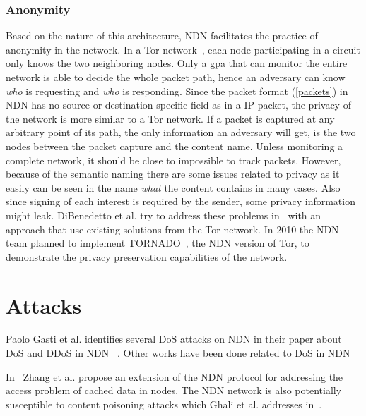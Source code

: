 \subsubsection{Anonymity}
Based on the nature of this architecture, \gls{NDN} facilitates the practice of anonymity in the network. 
In a Tor network~\cite{DBLP:conf/uss/DingledineMS04}, each node participating in a circuit only knows the two neighboring nodes.
Only a \gls{gpa} that can monitor the entire network is able to decide the whole packet path, hence an adversary can know \textit{who} is requesting and \textit{who} is responding.
Since the packet format (\autoref{packets}) in \gls{NDN} has no source or destination specific field as in a \gls{IP} packet, the privacy of the network is more similar to a Tor network.
If a packet is captured at any arbitrary point of its path, the only information an adversary will get, is the two nodes between the packet capture and the content \gls{name}. 
Unless monitoring a complete network, it should be close to impossible to track packets.  
However, because of the semantic naming there are some issues related to privacy as it easily can be seen in the \gls{name} \textit{what} the content contains in many cases.
Also since signing of each \gls{interest} is required by the sender, some privacy information might leak.
DiBenedetto et al. try to address these problems in~\cite{DBLP:conf/ndss/DiBenedettoGTU12} with an approach that use existing solutions from the Tor network.
In 2010 the \gls{NDN}-team planned to implement TORNADO~\cite[Section 3.7]{NDN-0001}, the \gls{NDN} version of Tor, to demonstrate the privacy preservation capabilities of the network.

\section{Attacks}

Paolo Gasti et al. identifies several \gls{DoS} attacks on \gls{NDN} in their paper about \gls{DoS} and \gls{DDoS} in \gls{NDN} ~\cite{DBLP:conf/icccn/GastiTU013}. 
Other works have been done related to \gls{DoS} in \gls{NDN}~\cite{DBLP:journals/ijcomsys/WangCZQZ14, DBLP:conf/ancs/SoNO13, DBLP:journals/corr/abs-1303-4823}

In~\cite{DBLP:journals/tifs/LiZZSF15} Zhang et al. propose an extension of the \gls{NDN} protocol for addressing the access problem of cached \gls{data} in nodes.  
The \gls{NDN} network is also potentially susceptible to content poisoning attacks which Ghali et al. addresses in~\cite{DBLP:journals/ccr/GhaliTU14}.

